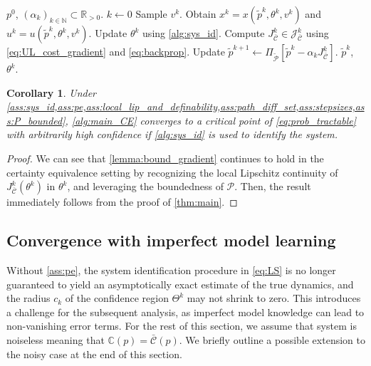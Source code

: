 \documentclass[journal,twoside,web,final]{ieeecolor}
\newtheorem{corollary}{Corollary}
\theoremstyle{definition}
\newcommand{\R}{\mathbb{R}}
\newcommand{\N}{\mathbb{N}}
\newcommand{\J}{\mathcal{J}}
\newcommand{\C}{\mathbb{C}}
\newcommand{\Cb}{{\bar{\mathcal{C}}}}
\begin{document}
\begin{algorithm}
\caption{Certainty equivalence algorithm.}\label{alg:main_CE}
\begin{algorithmic}[1]
\Input $p^0$, $(\alpha_k )_{k\in\N} \subset \R_{>0}$.
\Init $k \gets 0$
    \State Sample $v^k$.
    \State Obtain $x^k = x(\tilde{p}^k,\theta^k,v^k)$ and $u^k=u(\tilde{p}^k,\theta^k,v^k)$.
    \State Update $\theta^k$ using \cref{alg:sys_id}.
    \State Compute $J_\Cb^k \in \J_\Cb^k$ using \cref{eq:UL_cost_gradient} and \cref{eq:backprop}.
    \State Update $\tilde{p}^{k+1} \gets \Pi_{\tilde{\mathcal{P}}}[\tilde{p}^k - \alpha_k J_\Cb^k]$.
\EndWhile
\State \Return $\tilde{p}^k$, $\theta^k$.
\end{algorithmic}
\end{algorithm}

\begin{corollary}
Under \cref{ass:sys_id,ass:pe,ass:local_lip_and_definability,ass:path_diff_set,ass:stepsizes,ass:P_bounded}, \cref{alg:main_CE} converges to a critical point of \cref{eq:prob_tractable} with arbitrarily high confidence if \cref{alg:sys_id} is used to identify the system.
\end{corollary}
\begin{proof}
We can see that \cref{lemma:bound_gradient} continues to hold in the certainty equivalence setting by recognizing the local Lipschitz continuity of $J_\Cb^k(\theta^k)$ in $\theta^k$, and leveraging the boundedness of $\mathcal{P}$. Then, the result immediately follows from the proof of \cref{thm:main}.
\end{proof}

\subsection{Convergence with imperfect model learning}
\label{section:imperfect_learning}
Without \cref{ass:pe}, the system identification procedure in \cref{eq:LS} is no longer guaranteed to yield an asymptotically exact estimate of the true dynamics,
and the radius $c_k$ of the confidence region $\Theta^k$ may not shrink to zero.
This introduces a challenge for the subsequent analysis,
as imperfect model knowledge can lead to non-vanishing error terms.
For the rest of this section, we assume that system is noiseless meaning that $\C(p)=\bar{\mathcal{C}}(p)$. 
We briefly outline a possible extension to the noisy case at the end of this section.
\end{document}

